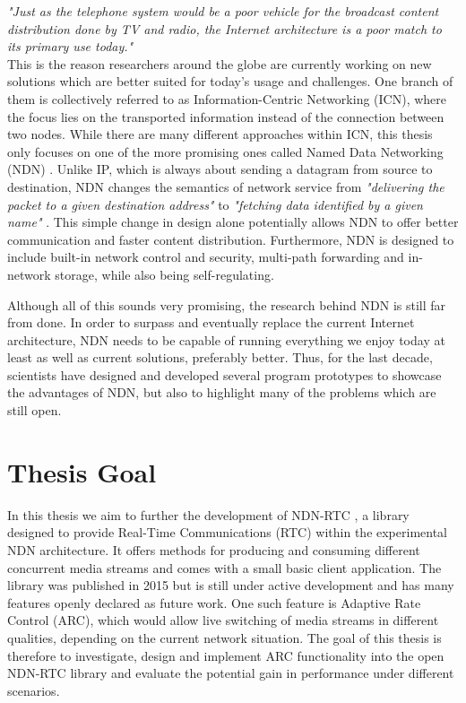 \textit{ "Just as the telephone system would be a poor vehicle for the broadcast content distribution done by TV and radio, the Internet architecture is a poor match to its primary use today."} \\

This is the reason researchers around the globe are currently working on new solutions which are better suited for today's usage and challenges. One branch of them is collectively referred to as Information-Centric Networking (ICN), where the focus lies on the transported information instead of the connection between two nodes. While there are many different approaches within ICN, this thesis only focuses on one of the more promising ones called Named Data Networking (NDN) \cite{ZEBJ10}. Unlike IP, which is always about sending a datagram from source to destination, NDN changes the semantics of network service from \textit{"delivering the packet to a given destination address"} to \textit{"fetching data identified by a given name"} \cite{ZABJ14}. This simple change in design alone potentially allows NDN to offer better communication and faster content distribution. Furthermore, NDN is designed to include built-in network control and security, multi-path forwarding and in-network storage, while also being self-regulating. \cite{ZEBJ10, ZABJ14}

Although all of this sounds very promising, the research behind NDN is still far from done. In order to surpass and eventually replace the current Internet architecture, NDN needs to be capable of running everything we enjoy today at least as well as current solutions, preferably better. Thus, for the last decade, scientists have designed and developed several program prototypes to showcase the advantages of NDN, but also to highlight many of the problems which are still open. 

\section{Thesis Goal}
In this thesis we aim to further the development of NDN-RTC \cite{GuBu15}, a library designed to provide Real-Time Communications (RTC) within the experimental NDN architecture. It offers methods for producing and consuming different concurrent media streams and comes with a small basic client application. The library was published in 2015 but is still under active development and has many features openly declared as future work. One such feature is Adaptive Rate Control (ARC), which would allow live switching of media streams in different qualities, depending on the current network situation. The goal of this thesis is therefore to investigate, design and implement ARC functionality into the open NDN-RTC library and evaluate the potential gain in performance under different scenarios.

